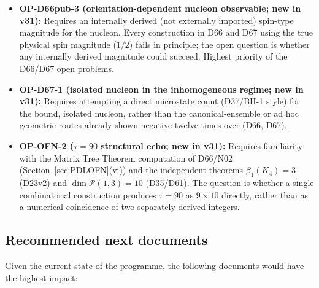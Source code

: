 \documentclass[11pt,a4paper]{article}
\theoremstyle{plain}
\theoremstyle{definition}
\theoremstyle{remark}
\begin{document}
\begin{itemize}
\item \textbf{OP-D66pub-3 (orientation-dependent nucleon observable; new in v31):} Requires an internally derived (not externally imported) spin-type magnitude for the nucleon. Every construction in D66 and D67 using the true physical spin magnitude ($1/2$) fails in principle; the open question is whether any internally derived magnitude could succeed. Highest priority of the D66/D67 open problems.
\item \textbf{OP-D67-1 (isolated nucleon in the inhomogeneous regime; new in v31):} Requires attempting a direct microstate count (D37/BH-1 style) for the bound, isolated nucleon, rather than the canonical-ensemble or ad hoc geometric routes already shown negative twelve times over (D66, D67).
\item \textbf{OP-OFN-2 ($\tau=90$ structural echo; new in v31):} Requires familiarity with the Matrix Tree Theorem computation of D66/N02 (Section~\ref{sec:PDLOFN}(vi)) and the independent theorems $\beta_1(K_4)=3$ (D23v2) and $\dim\mathcal P(1,3)=10$ (D35/D61). The question is whether a single combinatorial construction produces $\tau=90$ as $9\times10$ directly, rather than as a numerical coincidence of two separately-derived integers.
\end{itemize}

\subsection{Recommended next documents}
\label{subsec:nextdocs}
Given the current state of the programme, the following documents would have the highest impact:
\end{document}

